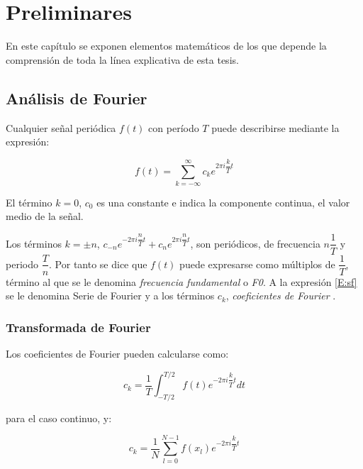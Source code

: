 \chapter{Preliminares}
En este cap\'itulo se exponen elementos matem\'aticos de los que depende la comprensi\'on de toda la l\'inea explicativa de esta tesis. 

\section{An\'alisis de Fourier} \label{fourier}
Cualquier se\~nal peri\'odica $f(t)$ con per\'iodo $T$ puede describirse mediante la expresi\'on:

\begin{equation}\label{E:sf}
f(t) = \sum_{k = -\infty}^{\infty}
c_k e^{2 \pi i \dfrac{k}{T} t}
\end{equation}


El t\'ermino $k = 0$, $c_0$ es una constante e indica la componente continua, el valor medio de la se\~nal.


Los t\'erminos $k = \pm n$, $c_{-n} e^{-2 \pi i \dfrac{n}{T} t} + c_n e^{2 \pi i \dfrac{n}{T} t}$, son peri\'odicos, de frecuencia $n \dfrac{1}{T}$ y periodo $\dfrac{T}{n}$. Por tanto se dice que $f(t)$ puede expresarse como m\'ultiplos de $\dfrac{1}{T}$, t\'ermino al que se le denomina \emph{frecuencia fundamental} o \emph{F0}. A la expresi\'on \ref{E:sf} se le denomina Serie de Fourier y a los t\'erminos $c_k$, \emph{coeficientes de Fourier} \cite{gautschinumerical, hansen2014fourier}.



\begin{comment}
recordar q formula fea fue resultado de combinar lo q vi en el libro viejo(hansen2014fourier) y en wifipedia
\end{comment}


\subsection{Transformada de Fourier} 
Los coeficientes de Fourier pueden calcularse como:

\begin{equation}\label{E:transformada_fourier_continua}
c_k = \dfrac{1}{T} \int_{-T/2}^{T/2}
f(t) e^{-2 \pi i \dfrac{k}{T} t} dt
\end{equation}

para el caso continuo, y:


\begin{equation}\label{E:transformada_fourier_discreta}
c_k = \dfrac{1}{N}
\sum\limits_{l = 0}^{N-1}
f(x_l) e^{-2 \pi i \dfrac{k}{T} t} 
\end{equation}

